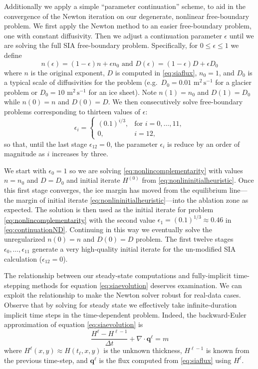 \documentclass[twocolumn,letterpaper]{igs}
\newcommand\bq{\mathbf{q}}
\newcommand{\Div}{\nabla\cdot}
\newcommand\eps{\epsilon}
\begin{document}
Additionally we apply a simple ``parameter continuation'' scheme, to aid in the convergence of the Newton iteration on our degenerate, nonlinear free-boundary problem.  We first apply the Newton method to an easier free-boundary problem, one with constant diffusivity.  Then we adjust a continuation parameter $\eps$ until we are solving the full SIA free-boundary problem.  Specifically, for $0 \le \eps \le 1$ we define
\begin{equation}
n(\eps) = (1\!-\eps) n + \eps n_0 \text{ and } D(\eps) = (1\!-\eps) D + \eps D_0  \label{eq:continuationND}
\end{equation}
where $n$ is the original exponent, $D$ is computed in \eqref{eq:siaflux}, $n_0=1$, and $D_0$ is a typical scale of diffusivities for the problem (e.g.~$D_0=0.01$ $\text{m}^2\,\text{s}^{-1}$ for a glacier problem or $D_0=10$ $\text{m}^2\,\text{s}^{-1}$ for an ice sheet).  Note $n(1)=n_0$ and $D(1)=D_0$ while $n(0)=n$ and $D(0)=D$.  We then consecutively solve free-boundary problems corresponding to thirteen values of $\eps$:
\begin{equation}
\eps_i = \begin{cases}
           (0.1)^{i/3}, & \text{for } i=0,\dots,11, \\
           0, & i=12,
         \end{cases}  \label{eq:continuationseq}
\end{equation}
so that, until the last stage $\eps_{12}=0$, the parameter $\eps_i$ is reduce by an order of magnitude as $i$ increases by three.

We start with $\eps_0=1$ so we are solving \eqref{eq:nonlincomplementarity} with values $n=n_0$ and $D=D_0$ and initial iterate $H^{(0)}$ from \eqref{eq:nonlininitialheuristic}.  Once this first stage converges, the ice margin has moved from the equilibrium line---the margin of initial iterate \eqref{eq:nonlininitialheuristic}---into the ablation zone as expected.  The solution is then used as the initial iterate for problem \eqref{eq:nonlincomplementarity} with the second value $\eps_1=(0.1)^{1/3}\approx 0.46$ in \eqref{eq:continuationND}.  Continuing in this way we eventually solve the unregularized $n(0)=n$ and $D(0)=D$ problem.  The first twelve stages $\eps_0,\dots,\eps_{11}$ generate a very high-quality initial iterate for the un-modified SIA calculation ($\eps_{12}=0$). 

The relationship between our steady-state computations and fully-implicit time-stepping methods for equation \eqref{eq:siaevolution} deserves examination.  We can exploit the relationship to make the Newton solver robust for real-data cases.  Observe that by solving for steady state we effectively take infinite-duration implicit time steps in the time-dependent problem.  Indeed, the backward-Euler \citep{MortonMayers2005} approximation of equation \eqref{eq:siaevolution} is
\begin{equation}
\frac{H^\ell - H^{\ell-1}}{\Delta t} + \Div \bq^\ell = m \label{eq:backwardeuler}
\end{equation}
where $H^\ell(x,y) \approx H(t_\ell,x,y)$ is the unknown thickness, $H^{\ell-1}$ is known from the previous time-step, and $\bq^\ell$ is the flux computed from \eqref{eq:siaflux} using $H^\ell$.
\end{document}
